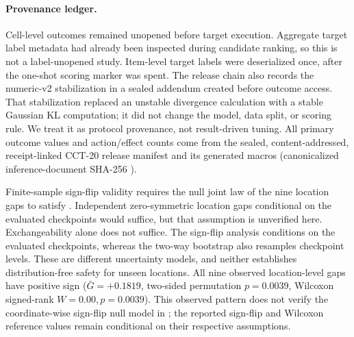 \paragraph{Provenance ledger.}
Cell-level outcomes remained unopened before target execution. Aggregate target label metadata had
already been inspected during candidate ranking, so this is not a label-unopened study.
Item-level target labels were deserialized once, after the one-shot scoring marker was spent. The
release chain also records the numeric-v2 stabilization in a sealed addendum created before outcome access.
That stabilization replaced an unstable divergence calculation with a stable Gaussian KL computation; it
did not change the model, data split, or scoring rule. We treat it as protocol provenance, not
result-driven tuning. All primary outcome values and action/effect counts come from the sealed,
content-addressed, receipt-linked CCT-20 release manifest and its generated macros
(canonicalized inference-document SHA-256
\hashtext{\CCTInferenceSHA}).

\begin{table}[t]
\centering
\scriptsize
\caption{Locked CCT-20 primary contrasts. The estimand is baseline regret minus KGA regret, so
positive values mean lower regret for KGA. Intervals use a paired two-way product bootstrap that
resamples checkpoint rows and location columns independently. Two nominal 97.5\% per-comparison
intervals target a nominal 95\% Bonferroni family level; actual family coverage requires valid
marginal coverage. Reference $p$-values enumerate one-sided sign flips of the nine location means
under . Holm adjusts only these reference values; the threshold
flags reproduce the locked calculation, not a verified population guarantee.}
\label{tab:cct20-primary}
\resizebox{\textwidth}{!}{}
\end{table}

Finite-sample sign-flip validity requires the null joint law of the nine location gaps to satisfy
. Independent zero-symmetric location gaps conditional on the
evaluated checkpoints would suffice, but that assumption is unverified here. Exchangeability alone
does not suffice. The sign-flip analysis conditions on the evaluated checkpoints, whereas the
two-way bootstrap also resamples checkpoint levels. These are different uncertainty models, and
neither establishes distribution-free safety for unseen locations.
All nine observed location-level gaps have positive sign ($\bar{G} = +0.1819$, two-sided permutation $p = 0.0039$, Wilcoxon signed-rank $W = 0.00, p = 0.0039$). This observed pattern does not verify the coordinate-wise sign-flip null model in ; the reported sign-flip and Wilcoxon reference values remain conditional on their respective assumptions.

